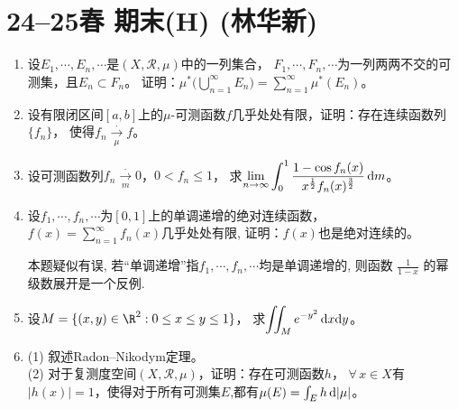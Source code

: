 \section{24--25春 期末(H) (林华新)}
\begin{enumerate}
\item 设$E_1,\cdots,E_n,\cdots$是$(X,\mathcal{R},\mu)$中的一列集合，
$F_1,\cdots,F_n,\cdots$为一列两两不交的可测集，且$E_n \subset F_n$。
证明：$\mu^*\Big(\bigcup\limits_{n=1}^{\infty}E_n\Big)=\sum\limits_{n=1}^{\infty}\mu^*(E_n)$。

\item 设有限闭区间$[a,b]$上的$\mu$-可测函数$f$几乎处处有限，证明：存在连续函数列$\{f_n\}$，
使得$f_n\underset{\mu}{\stackrel{.}{\longrightarrow}}f$。

\item 设可测函数列$f_n\underset{m}{\stackrel{.}{\longrightarrow}}0$，$0<f_n\le1$，
求$\displaystyle\lim_{n\to\infty}\int_0^1\frac{1-\cos f_n(x)}{x^\frac{1}{2}f_n(x)^\frac{3}{2}}\,{\rm d}m$。

\item 设$f_1,\cdots,f_n,\cdots$为$[0,1]$上的单调递增的绝对连续函数，
$f(x)=\sum\limits_{n=1}^{\infty}f_n(x)$几乎处处有限,
证明：$f(x)$也是绝对连续的。

\begin{remark*}
    本题疑似有误, 若``单调递增''指$f_1,\cdots,f_n,\cdots$均是单调递增的, 
    则函数 $\frac{1}{1-x}$ 的幂级数展开是一个反例.
\end{remark*}

\item 设$M=\{(x,y)\in\R^2:0 \le x \le y \le 1\}$，
求$\displaystyle\iint_M e^{-y^2}\,{\rm d}x{\rm d}y$。

\item (1) 叙述Radon--Nikodym定理。\\
(2) 对于复测度空间$(X,\mathcal{R},\mu)$，证明：存在可测函数$h$，
$\forall\,x \in X$有$|h(x)|=1$，使得对于所有可测集$E$,都有$\mu(E)=\int_Eh\,{\rm d}|\mu|$。
\end{enumerate}

